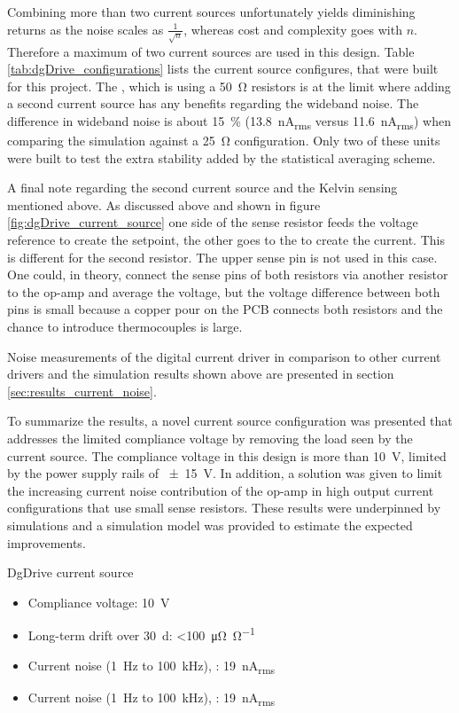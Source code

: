 Combining more than two current sources unfortunately yields diminishing returns as the noise scales as $\frac{1}{\sqrt{n}}$, whereas cost and complexity goes with $n$. Therefore a maximum of two current sources are used in this design. Table \ref{tab:dgDrive_configurations} lists the current source configures, that were built for this project. The , which is using a \qty{50}{\ohm} resistors is at the limit where adding a second current source has any benefits regarding the wideband noise. The difference in wideband noise is about \qty{15}{\percent} (\qty{13.8}{\nA_{rms}} versus \qty{11.6}{\nA_{rms}}) when comparing the simulation against a \qty{25}{\ohm} configuration. Only two of these units were built to test the extra stability added by the statistical averaging scheme.

A final note regarding the second current source and the Kelvin sensing mentioned above. As discussed above and shown in figure \ref{fig:dgDrive_current_source} one side of the sense resistor feeds the voltage reference to create the setpoint, the other goes to the  to create the current. This is different for the second resistor. The upper sense pin is not used in this case. One could, in theory, connect the sense pins of both resistors via another resistor to the op-amp and average the voltage, but the voltage difference between both pins is small because a copper pour on the PCB connects both resistors and the chance to introduce thermocouples is large.

Noise measurements of the digital current driver in comparison to other current drivers and the simulation results shown above are presented in section \ref{sec:results_current_noise}.

To summarize the results, a novel current source configuration was presented that addresses the limited compliance voltage by removing the load seen by the current source. The compliance voltage in this design is more than \qty{10}{\V}, limited by the power supply rails of \qty{\pm 15}{\V}. In addition, a solution was given to limit the increasing current noise contribution of the op-amp in high output current configurations that use small sense resistors. These results were underpinned by simulations and a simulation model was provided to estimate the expected improvements.
\begin{center}
    \begin{deviceProperties}[label={lst:dgDrive_properties_current_source}]{DgDrive current source}
    \begin{itemize}
        \item Compliance voltage: \qty{10}{\V}
        \item Long-term drift over \qty{30}{\day}: \qty{<100}{\micro\ohm \per \ohm}
        \item Current noise (\qty{1}{\Hz} to \qty{100}{\kHz}), : \qty{19}{\nA_{rms}}
        \item Current noise (\qty{1}{\Hz} to \qty{100}{\kHz}), : \qty{19}{\nA_{rms}}
    \end{itemize}
    \end{deviceProperties}
\end{center}

